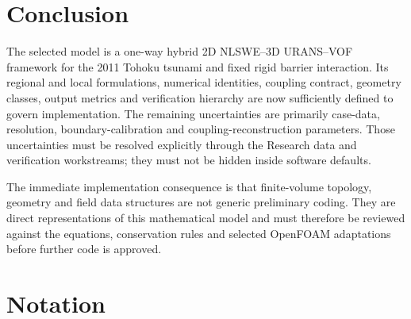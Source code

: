 \documentclass[11pt,a4paper]{article}
\begin{document}
\section{Conclusion}

The selected model is a one-way hybrid 2D NLSWE--3D URANS--VOF framework for the 2011 Tohoku tsunami and fixed rigid barrier interaction. Its regional and local formulations, numerical identities, coupling contract, geometry classes, output metrics and verification hierarchy are now sufficiently defined to govern implementation. The remaining uncertainties are primarily case-data, resolution, boundary-calibration and coupling-reconstruction parameters. Those uncertainties must be resolved explicitly through the Research data and verification workstreams; they must not be hidden inside software defaults.

The immediate implementation consequence is that finite-volume topology, geometry and field data structures are not generic preliminary coding. They are direct representations of this mathematical model and must therefore be reviewed against the equations, conservation rules and selected OpenFOAM adaptations before further code is approved.

\appendix
\section{Notation}
\end{document}
